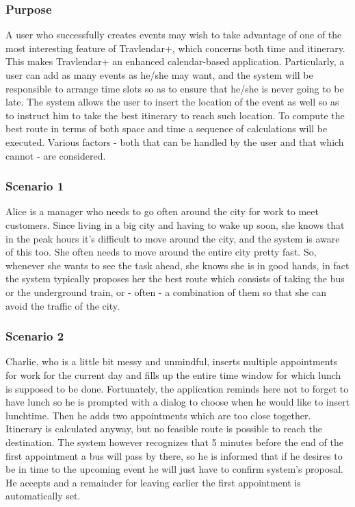 \subsubsection{Purpose}
A user who successfully creates events may wish to take advantage of one of the most interesting feature of Travlendar+, which concerns both time and itinerary. This makes Travlendar+ an enhanced calendar-based application. Particularly, a user can add as many events as he/she may want, and the system will be responsible to arrange time slots so as to ensure that he/she is never going to be late. The system allows the user to insert the location of the event as well so as to instruct him to take the best itinerary to reach such location. To compute the best route in terms of both space and time a sequence of calculations will be executed. Various factors - both that can be handled by the user and that which cannot - are considered.

\subsubsection{Scenario 1}
Alice is a manager who needs to go often around the city for work to meet customers. Since living in a big city and having to wake up soon, she knows that in the peak hours it's difficult to move around the city, and the system is aware of this too. She often needs to move around the entire city pretty fast. So, whenever she wants to see the task ahead, she knows she is in good hands, in fact the system typically proposes her the best route which consists of taking the bus or the underground train, or - often - a combination of them so that she can avoid the traffic of the city. 
\subsubsection{Scenario 2}
Charlie, who is a little bit messy and unmindful, inserts multiple appointments for work for the current day and fills up the entire time window for which lunch is supposed to be done. Fortunately, the application reminds here not to forget to have lunch so he is prompted with a dialog to choose when he would like to insert lunchtime. Then he adds two appointments which are too close together. Itinerary is calculated anyway, but no feasible route is possible to reach the destination. The system however recognizes that 5 minutes before the end of the first appointment a bus will pass by there, so he is informed that if he desires to be in time to the upcoming event he will just have to confirm system's proposal. He accepts and a remainder for leaving earlier the first appointment is automatically set. 
